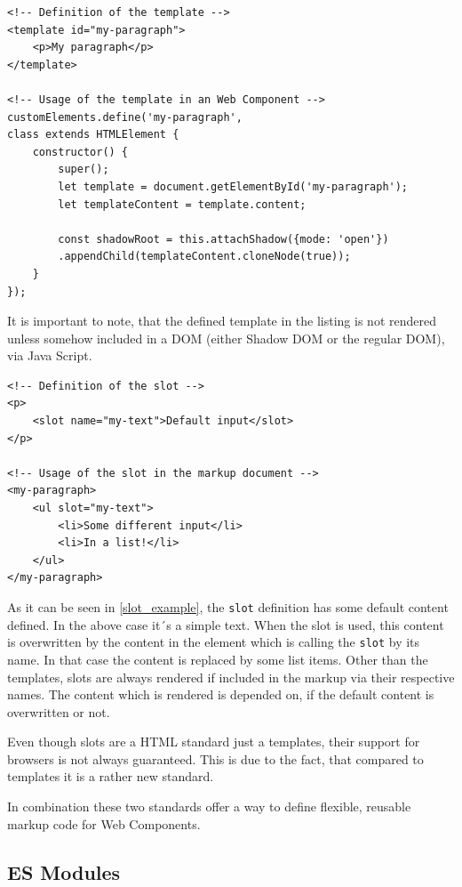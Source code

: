 \begin{lstlisting}[caption=Definition and usage of the \texttt{template} standard \cite{wc_html_template_slots}, label=template_example]
<!-- Definition of the template -->
<template id="my-paragraph">
	<p>My paragraph</p>
</template>

<!-- Usage of the template in an Web Component -->
customElements.define('my-paragraph',
class extends HTMLElement {
	constructor() {
		super();
		let template = document.getElementById('my-paragraph');
		let templateContent = template.content;
		
		const shadowRoot = this.attachShadow({mode: 'open'})
		.appendChild(templateContent.cloneNode(true));
	}
});
\end{lstlisting}

It is important to note, that the defined template in the listing is not rendered unless somehow included in a DOM (either Shadow DOM or the regular DOM), via Java Script.

\begin{lstlisting}[language=HTML5, caption=Definition and usage of the \texttt{slot} standard \cite{wc_html_template_slots}, label=slot_example]
<!-- Definition of the slot -->
<p>
	<slot name="my-text">Default input</slot>
</p>

<!-- Usage of the slot in the markup document -->
<my-paragraph>
	<ul slot="my-text">
		<li>Some different input</li>
		<li>In a list!</li>
	</ul>
</my-paragraph>
\end{lstlisting}

As it can be seen in \ref{slot_example}, the \texttt{slot} definition has some default content defined. In the above case it´s a simple text. When the slot is used, this content is overwritten by the content in the element which is calling the \texttt{slot} by its name.
In that case the content is replaced by some list items.
Other than the templates, slots are always rendered if included in the markup via their respective names. The content which is rendered is depended on, if the default content is overwritten or not.

Even though slots are a HTML standard just a templates, their support for browsers is not always guaranteed. This is due to the fact, that compared to templates it is a rather new standard.

In combination these two standards offer a way to define flexible, reusable markup code for Web Components.\cite{wc_html_template_slots}

\subsection{ES Modules}

